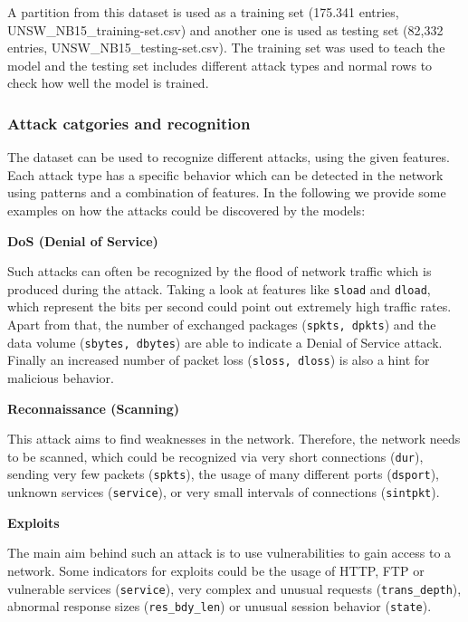 \nextparagraph
A partition from this dataset is used as a training set (175.341 entries, UNSW\_NB15\_training-set.csv) and another one is used as testing set (82,332 entries, UNSW\_NB15\_testing-set.csv). The training set was used to teach the model and the testing set includes different attack types and normal rows to check how well the model is trained. 


\subsubsection{Attack catgories and recognition}
The dataset can be used to recognize different attacks, using the given features. Each attack type has a specific behavior which can be detected in the network using patterns and a combination of features. In the following we provide some examples on how the attacks could be discovered by the models:


\vspace{4mm}
\nextparagraph
\textbf{DoS (Denial of Service)}

\nextparagraph
Such attacks can often be recognized by the flood of network traffic which is produced during the attack. Taking a look at features like \texttt{sload} and \texttt{dload}, which represent the bits per second could point out extremely high traffic rates. Apart from that, the number of exchanged packages (\texttt{spkts, dpkts}) and the data volume (\texttt{sbytes, dbytes}) are able to indicate a Denial of Service attack. Finally an increased number of packet loss (\texttt{sloss, dloss}) is also a hint for malicious behavior.


\vspace{4mm}
\nextparagraph
\textbf{Reconnaissance (Scanning)}

\nextparagraph
This attack aims to find weaknesses in the network. Therefore, the network needs to be scanned, which could be recognized via very short connections (\texttt{dur}), sending very few packets (\texttt{spkts}), the usage of many different ports (\texttt{dsport}), unknown services (\texttt{service}), or very small intervals of connections (\texttt{sintpkt}).

\vspace{4mm}
\nextparagraph
\textbf{Exploits}

\nextparagraph
The main aim behind such an attack is to use vulnerabilities to gain access to a network.  Some indicators for exploits could be the usage of HTTP, FTP or vulnerable services (\texttt{service}),  very complex and unusual requests (\texttt{trans\_depth}), abnormal response sizes (\texttt{res\_bdy\_len}) or unusual session behavior (\texttt{state}).

